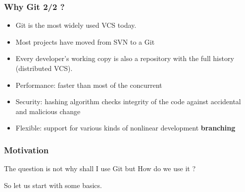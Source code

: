 \begin{frame}
\frametitle{Why Git 2/2 ?}

\begin{itemize}
\item Git is the most widely used VCS today. 
\item Most projects have moved from SVN to a Git
\item Every developer's working copy is also a repository with the full history
(distributed VCS).
\item Performance: faster than most of the concurrent \\
\item Security: hashing algorithm checks integrity of the code against accidental and malicious change\\
\item Flexible: support for various kinds of nonlinear development \textbf{branching}\\
\end{itemize}
\end{frame}


\begin{frame}
\frametitle{Motivation}

\begin{center}
The question is not why shall I use Git but How do we use it ?
\end{center}

\begin{center}
So let us start with some basics.
\end{center}

\end{frame}

